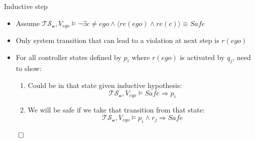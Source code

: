 \documentclass[xcolor=table]{beamer}
\begin{document}
\begin{frame}{Inductive step}

	\begin{itemize}
		\item 	Assume $\mathcal{TS_n}, V_{eqo} \models \neg \exists c \neq ego \land \langle re(ego) \land re(c)\rangle \equiv Safe$\\
		\pause
		\item Only system transition that can lead to a violation at next step is $r(ego)$\\
		\pause
		\item For all controller states defined by $p_i$ where $r(ego)$ is activated by $q_j$, need to show:
		\begin{enumerate}
			\pause
			\item Could be in that state given inductive hypothesis:
			$$\mathcal{TS_n}, V_{eqo} \models Safe \Rightarrow p_i$$
			\pause
			\item We will be safe if we take that transition from that state:
			$$\mathcal{TS_n}, V_{eqo}\models p_i \land r_j \Rightarrow Safe$$
		\end{enumerate}
	\end{itemize}
\pause
$\qed$

\end{frame}
\end{document}
